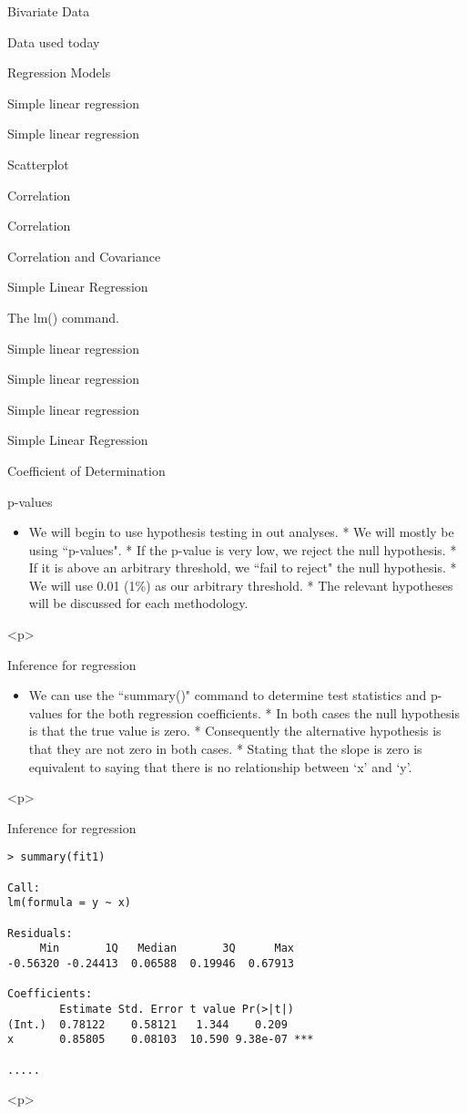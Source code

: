 \begin{slide}{Bivariate Data}
\begin{slide}{Data used today}
\begin{slide}{Regression Models}
\begin{slide}{Simple linear regression}
\begin{slide}{Simple linear regression}
\begin{slide}{Scatterplot}
\begin{slide}{Correlation}
\begin{slide}{Correlation}
\begin{slide}{Correlation and Covariance}
\begin{slide}{Simple Linear Regression}
\begin{slide}{The lm() command.}
\begin{slide}{Simple linear regression}
\begin{slide}{Simple linear regression}
\begin{slide}{Simple linear regression}
\begin{slide}{Simple Linear Regression}
\begin{slide}{Coefficient of Determination}
\begin{slide}{p-values}
\begin{itemize}
\item
We will begin to use hypothesis testing in out analyses.
* We will mostly be using ``p-values".
* If the p-value is very low, we reject the null hypothesis.
* If it is above an arbitrary threshold, we ``fail to reject" the null hypothesis.
* We will use 0.01 (1\%) as our arbitrary threshold.
* The relevant hypotheses will be discussed for each methodology.
\end{itemize}
<p>


\begin{slide}{Inference for regression}
\begin{itemize}
\item
We can use the ``summary()" command to determine
test statistics and p-values for the both
regression coefficients.
* In both cases the null hypothesis is that the true value is zero.
* Consequently the alternative hypothesis is that they are not zero in both cases.
* Stating that the slope is zero is equivalent to saying that there is no relationship between `x' and `y'.
\end{itemize}
<p>

\begin{slide}{Inference for regression}
\begin{verbatim}
> summary(fit1)

Call:
lm(formula = y ~ x)

Residuals:
     Min       1Q   Median       3Q      Max
-0.56320 -0.24413  0.06588  0.19946  0.67913

Coefficients:
        Estimate Std. Error t value Pr(>|t|)
(Int.)  0.78122    0.58121   1.344    0.209
x       0.85805    0.08103  10.590 9.38e-07 ***

.....

\end{verbatim}
<p>


\end{slide}
\end{slide}
\end{slide}
\end{slide}
\end{slide}
\end{slide}
\end{slide}
\end{slide}
\end{slide}
\end{slide}
\end{slide}
\end{slide}
\end{slide}
\end{slide}
\end{slide}
\end{slide}
\end{slide}
\end{slide}
\end{slide}
